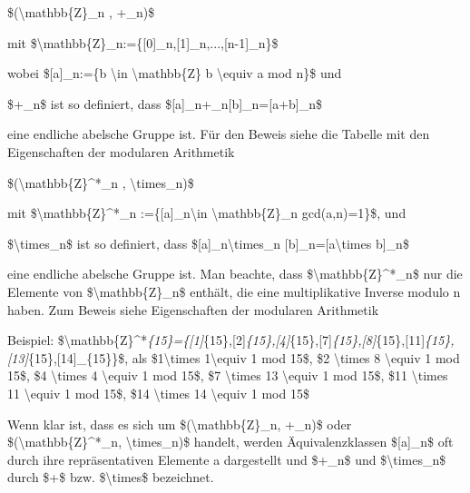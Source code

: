 \documentclass[a4paper]{article}
\begin{document}
\begin{multicols}{3}
\begin{itemize*}
            \begin{itemize*}
                  \item \$(\textbackslash mathbb\{Z\}\_n , +\_n)\$
                  \begin{itemize*} \item mit \$\textbackslash mathbb\{Z\}\_n:=\{{[}0{]}\_n,{[}1{]}\_n,...,{[}n-1{]}\_n\}\$ \item wobei \${[}a{]}\_n:=\{b \textbackslash in \textbackslash mathbb\{Z\} \textbar{} b \textbackslash equiv a mod n\}\$ und \item \$+\_n\$ ist so definiert, dass \${[}a{]}\_n+\_n{[}b{]}\_n={[}a+b{]}\_n\$ \item eine endliche abelsche Gruppe ist. Für den Beweis siehe die Tabelle mit den Eigenschaften der modularen Arithmetik \end{itemize*}
                  \item \$(\textbackslash mathbb\{Z\}\^{}*\_n , \textbackslash times\_n)\$
                  \begin{itemize*} \item mit \$\textbackslash mathbb\{Z\}\^{}*\_n :=\{{[}a{]}\_n\textbackslash in \textbackslash mathbb\{Z\}\_n \textbar{} gcd(a,n)=1\}\$, und \item \$\textbackslash times\_n\$ ist so definiert, dass \${[}a{]}\_n\textbackslash times\_n {[}b{]}\_n={[}a\textbackslash times b{]}\_n\$ \item eine endliche abelsche Gruppe ist. Man beachte, dass \$\textbackslash mathbb\{Z\}\^{}*\_n\$ nur die Elemente von \$\textbackslash mathbb\{Z\}\_n\$ enthält, die eine multiplikative Inverse modulo n haben. Zum Beweis siehe Eigenschaften der modularen Arithmetik \item Beispiel: \$\textbackslash mathbb\{Z\}\^{}*\emph{\{15\}=\{{[}1{]}}\{15\},{[}2{]}\emph{\{15\},{[}4{]}}\{15\},{[}7{]}\emph{\{15\},{[}8{]}}\{15\},{[}11{]}\emph{\{15\},{[}13{]}}\{15\},{[}14{]}\_\{15\}\}\$, als \$1\textbackslash times 1\textbackslash equiv 1 mod 15\$, \$2 \textbackslash times 8 \textbackslash equiv 1 mod 15\$, \$4 \textbackslash times 4 \textbackslash equiv 1 mod 15\$, \$7 \textbackslash times 13 \textbackslash equiv 1 mod 15\$, \$11 \textbackslash times 11 \textbackslash equiv 1 mod 15\$, \$14 \textbackslash times 14 \textbackslash equiv 1 mod 15\$ \end{itemize*}
            \end{itemize*}
            \item
            Wenn klar ist, dass es sich um \$(\textbackslash mathbb\{Z\}\_n,
            +\_n)\$ oder \$(\textbackslash mathbb\{Z\}\^{}*\_n,
            \textbackslash times\_n)\$ handelt, werden Äquivalenzklassen
            \${[}a{]}\_n\$ oft durch ihre repräsentativen Elemente a dargestellt
            und \$+\_n\$ und \$\textbackslash times\_n\$ durch \$+\$ bzw.
            \$\textbackslash times\$ bezeichnet.


\end{itemize*}
\end{multicols}
\end{document}
